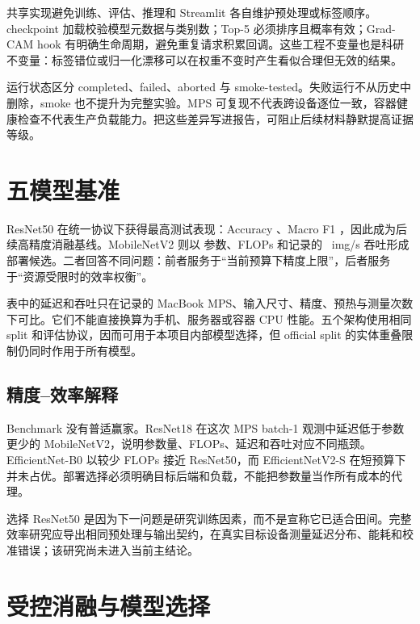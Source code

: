 \documentclass[UTF8,11pt]{ctexart}
\begin{document}
共享实现避免训练、评估、推理和 Streamlit 各自维护预处理或标签顺序。checkpoint 加载校验模型元数据与类别数；Top-5 必须排序且概率有效；Grad-CAM hook 有明确生命周期，避免重复请求积累回调。这些工程不变量也是科研不变量：标签错位或归一化漂移可以在权重不变时产生看似合理但无效的结果。

运行状态区分 completed、failed、aborted 与 smoke-tested。失败运行不从历史中删除，smoke 也不提升为完整实验。MPS 可复现不代表跨设备逐位一致，容器健康检查不代表生产负载能力。把这些差异写进报告，可阻止后续材料静默提高证据等级。

\section{五模型基准}



ResNet50 在统一协议下获得最高测试表现：Accuracy \PDAWeekTwoAccuracy、Macro F1 \PDAWeekTwoMacroFOne，因此成为后续高精度消融基线。MobileNetV2 则以 \PDAMobileParams 参数、\PDAMobileFlops FLOPs 和记录的 \PDAMobileThroughput~img/s 吞吐形成部署候选。二者回答不同问题：前者服务于“当前预算下精度上限”，后者服务于“资源受限时的效率权衡”。

表中的延迟和吞吐只在记录的 MacBook MPS、输入尺寸、精度、预热与测量次数下可比。它们不能直接换算为手机、服务器或容器 CPU 性能。五个架构使用相同 split 和评估协议，因而可用于本项目内部模型选择，但 official split 的实体重叠限制仍同时作用于所有模型。

\subsection*{精度--效率解释}

Benchmark 没有普适赢家。ResNet18 在这次 MPS batch-1 观测中延迟低于参数更少的 MobileNetV2，说明参数量、FLOPs、延迟和吞吐对应不同瓶颈。EfficientNet-B0 以较少 FLOPs 接近 ResNet50，而 EfficientNetV2-S 在短预算下并未占优。部署选择必须明确目标后端和负载，不能把参数量当作所有成本的代理。

选择 ResNet50 是因为下一问题是研究训练因素，而不是宣称它已适合田间。完整效率研究应导出相同预处理与输出契约，在真实目标设备测量延迟分布、能耗和校准错误；该研究尚未进入当前主结论。

\section{受控消融与模型选择}


\end{document}
